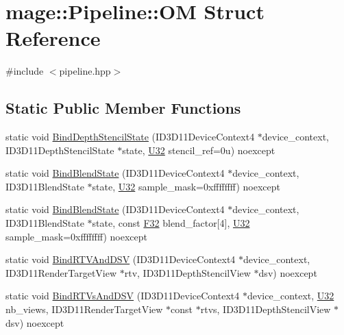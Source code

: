\hypertarget{structmage_1_1_pipeline_1_1_o_m}{}\section{mage\+:\+:Pipeline\+:\+:OM Struct Reference}
\label{structmage_1_1_pipeline_1_1_o_m}


{\ttfamily \#include $<$pipeline.\+hpp$>$}

\subsection*{Static Public Member Functions}
\begin{DoxyCompactItemize}
\item 
static void \hyperlink{structmage_1_1_pipeline_1_1_o_m_a03190c521a1f7b30d12dfdd9bc1ca933}{Bind\+Depth\+Stencil\+State} (I\+D3\+D11\+Device\+Context4 $\ast$device\+\_\+context, I\+D3\+D11\+Depth\+Stencil\+State $\ast$state, \hyperlink{namespacemage_a41c104c036fba3756a74e19f793eeaa1}{U32} stencil\+\_\+ref=0u) noexcept
\item 
static void \hyperlink{structmage_1_1_pipeline_1_1_o_m_a6f753f497555088423b58dea7689b031}{Bind\+Blend\+State} (I\+D3\+D11\+Device\+Context4 $\ast$device\+\_\+context, I\+D3\+D11\+Blend\+State $\ast$state, \hyperlink{namespacemage_a41c104c036fba3756a74e19f793eeaa1}{U32} sample\+\_\+mask=0xffffffff) noexcept
\item 
static void \hyperlink{structmage_1_1_pipeline_1_1_o_m_aec599ec22f8694479158597c5118435b}{Bind\+Blend\+State} (I\+D3\+D11\+Device\+Context4 $\ast$device\+\_\+context, I\+D3\+D11\+Blend\+State $\ast$state, const \hyperlink{namespacemage_aa97e833b45f06d60a0a9c4fc22ae02c0}{F32} blend\+\_\+factor\mbox{[}4\mbox{]}, \hyperlink{namespacemage_a41c104c036fba3756a74e19f793eeaa1}{U32} sample\+\_\+mask=0xffffffff) noexcept
\item 
static void \hyperlink{structmage_1_1_pipeline_1_1_o_m_a6f854210cf5d63f8e2b95c075edb65ed}{Bind\+R\+T\+V\+And\+D\+SV} (I\+D3\+D11\+Device\+Context4 $\ast$device\+\_\+context, I\+D3\+D11\+Render\+Target\+View $\ast$rtv, I\+D3\+D11\+Depth\+Stencil\+View $\ast$dsv) noexcept
\item 
static void \hyperlink{structmage_1_1_pipeline_1_1_o_m_a02b4ded0f2ead8684dc1986a63c613d6}{Bind\+R\+T\+Vs\+And\+D\+SV} (I\+D3\+D11\+Device\+Context4 $\ast$device\+\_\+context, \hyperlink{namespacemage_a41c104c036fba3756a74e19f793eeaa1}{U32} nb\+\_\+views, I\+D3\+D11\+Render\+Target\+View $\ast$const $\ast$rtvs, I\+D3\+D11\+Depth\+Stencil\+View $\ast$dsv) noexcept

\end{DoxyCompactItemize}
